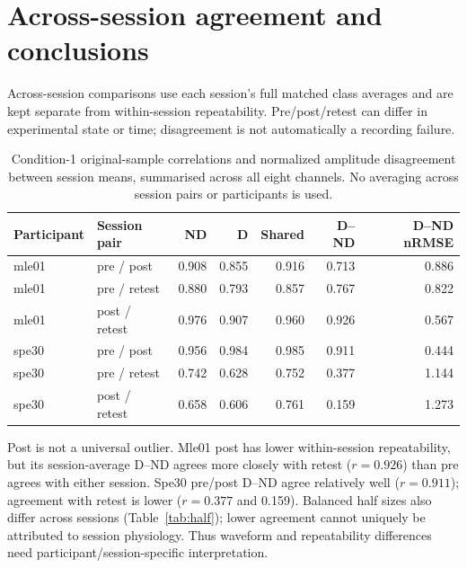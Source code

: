\documentclass[11pt,a4paper]{article}
\begin{document}
\section{Across-session agreement and conclusions}
Across-session comparisons use each session's full matched class averages and are kept separate from within-session repeatability. Pre/post/retest can differ in experimental state or time; disagreement is not automatically a recording failure.
\begin{table}[H]\centering\small
\begin{tabular}{@{}llrrrrr@{}}\toprule
Participant & Session pair & ND & D & Shared & D--ND & D--ND nRMSE\\\midrule
mle01 & pre / post & 0.908 & 0.855 & 0.916 & 0.713 & 0.886 \\
mle01 & pre / retest & 0.880 & 0.793 & 0.857 & 0.767 & 0.822 \\
mle01 & post / retest & 0.976 & 0.907 & 0.960 & 0.926 & 0.567 \\
spe30 & pre / post & 0.956 & 0.984 & 0.985 & 0.911 & 0.444 \\
spe30 & pre / retest & 0.742 & 0.628 & 0.752 & 0.377 & 1.144 \\
spe30 & post / retest & 0.658 & 0.606 & 0.761 & 0.159 & 1.273 \\
\bottomrule\end{tabular}
\caption{Condition-1 original-sample correlations and normalized amplitude disagreement between session means, summarised across all eight channels. No averaging across session pairs or participants is used.}\label{tab:sessions}
\end{table}
Post is not a universal outlier. Mle01 post has lower within-session repeatability, but its session-average D--ND agrees more closely with retest ($r=0.926$) than pre agrees with either session. Spe30 pre/post D--ND agree relatively well ($r=0.911$); agreement with retest is lower ($r=0.377$ and 0.159). Balanced half sizes also differ across sessions (Table~\ref{tab:half}); lower agreement cannot uniquely be attributed to session physiology. Thus waveform and repeatability differences need participant/session-specific interpretation.
\end{document}
